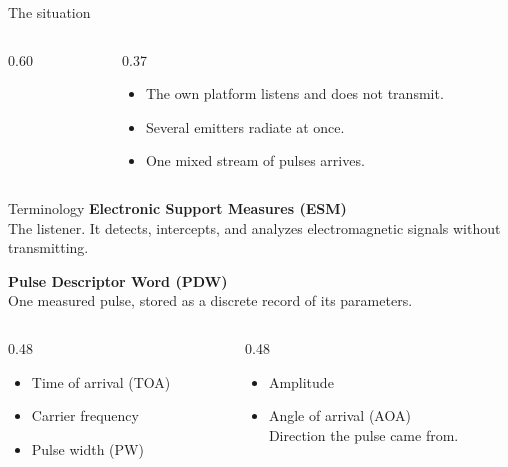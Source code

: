 \documentclass[aspectratio=169,10pt]{beamer}
\newcommand{\thesisfig}[3]{%
  \resizebox{#1}{#2}{}%
}
\begin{document}
\begin{frame}{The situation}
  \begin{columns}[c]
    \begin{column}{0.60\textwidth}
      \centering
      \thesisfig{\linewidth}{!}{../figures/background/esm_scene.tex}
    \end{column}
    \begin{column}{0.37\textwidth}
      \begin{itemize}
        \item The own platform listens and does not transmit.
        \item Several emitters radiate at once.
        \item One mixed stream of pulses arrives.
      \end{itemize}
    \end{column}
  \end{columns}
\end{frame}

\begin{frame}{Terminology}
  \textbf{Electronic Support Measures (ESM)}\\[0.2em]
  The listener. It detects, intercepts, and analyzes electromagnetic signals without transmitting.

  \vspace{0.7em}
  \textbf{Pulse Descriptor Word (PDW)}\\[0.2em]
  One measured pulse, stored as a discrete record of its parameters.

  \vspace{0.8em}
  \begin{columns}[T]
    \begin{column}{0.48\textwidth}
      \begin{itemize}
        \item Time of arrival (TOA)
        \item Carrier frequency
        \item Pulse width (PW)
      \end{itemize}
    \end{column}
    \begin{column}{0.48\textwidth}
      \begin{itemize}
        \item Amplitude
        \item Angle of arrival (AOA)\\
              {\footnotesize Direction the pulse came from.}
      \end{itemize}
    \end{column}
  \end{columns}
\end{frame}
\end{document}
